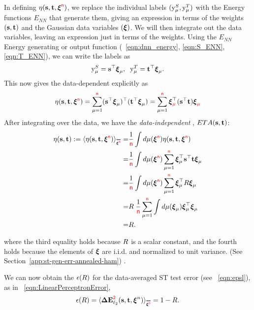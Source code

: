 In defining $\eta({\mathbf{s}},{\mathbf{t}},\boldsymbol{\xi}^{{\color{red}\sf{n}}})$, we replace the individual labels $(\mathrm{y}_{\mu}^{S},\mathrm{y}_{\mu}^{T})$ with the Energy functions $E_{NN}$ that generate them, giving an expression in terms of the weights $({\mathbf{s}},{\mathbf{t}})$ and the Gaussian data variables $(\boldsymbol{\xi})$. We will then integrate out the data variables, leaving an expression just in terms of the weights.  
Using the $E_{NN}$ Energy generating or output function (\EQN~\ref{eqn:dnn_energy}, \ref{eqn:S_ENN}, \ref{eqn:T_ENN}), we can write the labels as
\begin{align}
\mathrm{y}_{\mu}^{S}={\mathbf{s}}^{\top}\boldsymbol{\xi}_{\mu},\;\;
\mathrm{y}_{\mu}^{T}={\mathbf{t}}^{\top}\boldsymbol{\xi}_{\mu}  .
\end{align}
This now gives the data-dependent \SelfOverlap explicitly as
\begin{align}
  \label{eqn:eta_vec_xi_def}
\eta({\mathbf{s}},{\mathbf{t}},\boldsymbol{\xi}^{{\color{red}\sf{n}}}) =\sum_{\mu=1}^{{\color{red}\sf{n}}} ({\mathbf{s}}^{\top}\boldsymbol{\xi}_{\mu})^{\top} ({\mathbf{t}}^{\top}\boldsymbol{\xi}_{\mu}) = \sum_{\mu=1}^{{\color{red}\sf{n}}}\boldsymbol{\xi}^{\top}_{{\color{red}\sf{\mu}}}  ({\mathbf{s}}^{\top} {\mathbf{t}} )\boldsymbol{\xi}_{{\color{red}\sf{\mu}}} 
\end{align}
After integrating over the data, we have the \emph{data-independent \SelfOverlap}, $ETA({\mathbf{s}},{\mathbf{t}})$:
\begin{align}
\label{eqn:eta_vec_avg_def}
\ETA(\SVEC,\TVEC) := \langle\ETA(\SVEC,\TVEC,\NDXI)\rangle_{\AVGNDXI}
   = & \frac{1}{\ND}\int d\mu(\NDXI)\ETA(\SVEC,\TVEC,\NDXI) \\ \nonumber
= & \frac{1}{\ND}\int d\mu(\NDXI)\sum_{\mu=1}^{\ND}\XI_{\mu}^{\top}\SVEC^{\top}\TVEC\XI_{\mu} \\ \nonumber
= & \frac{1}{\ND}\int d\mu(\NDXI)\sum_{\mu=1}^{\ND}\XI_{\mu}^{\top}\AVGR\XI_{\mu} \\ \nonumber
= & \AVGR\;\frac{1}{\ND}\sum_{\mu=1}^{\ND}\int d\mu(\XI_{\mu})\XI_{\mu}^{\top}\XI_{\mu} \\ \nonumber
   = &\AVGR.
\end{align}

where the third equality holds because $R$ is a scalar constant, and the fourth holds because the elements of $\boldsymbol{\xi}$ are i.i.d. and normalized to unit variance.
(See Section~\ref{app:st-gen-err-annealed-ham}) .

We can now obtain the \EffectivePotential $\epsilon(R)$ for the data-averaged ST test error (see \EQN~\ref{eqn:epsl}),  as in \EQN~\ref{eqn:LinearPerceptronError},
\begin{align}
\label{eqn:e0}
\EPSL(\AVGR)=\langle\DETOPSTLL\rangle_{\AVGNDXI} =  1 - \AVGR .
\end{align}

